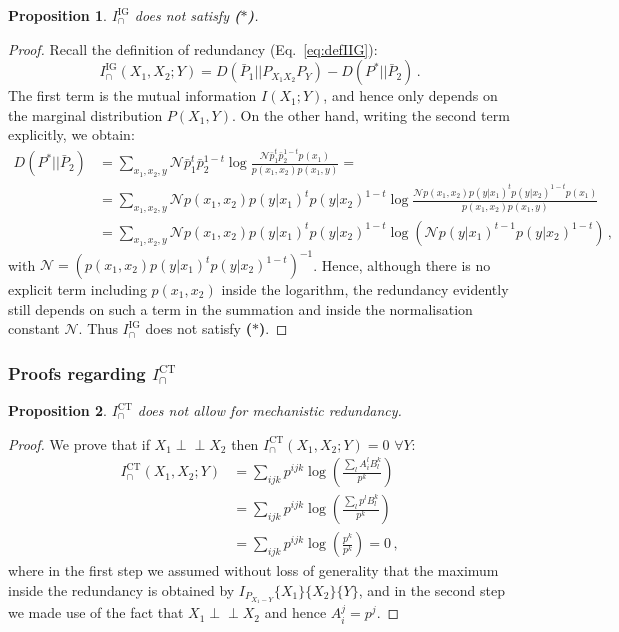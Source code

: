 \documentclass{article}
\newcommand{\ind}{\mathrel{\perp\!\!\!\perp}}
\newcommand{\argct}[3]{\{#1\}\{#2\}\{#3\}}
\newcommand{\AST}{\textbf{($\boldsymbol{\ast}$)}\xspace} %
\newcommand{\ICT}{\ensuremath{I_\cap^{\text{CT}}}\xspace}
\newcommand{\IIG}{\ensuremath{I_\cap^{\text{IG}}}\xspace}
\newcommand{\IIGs}{\ensuremath{I_\cap^{\text{IG}}(X_1,X_2;Y)}\xspace}
\newtheorem{proposition}{Proposition}
\begin{document}
\begin{proposition} \label{prop:IG-noAST}
    \IIG does not satisfy \AST.
\end{proposition}
\begin{proof}
    Recall the definition of redundancy (Eq.~\eqref{eq:defIIG}):
    \begin{equation}
        \IIGs = D(\bar{P}_1||P_{X_1X_2}P_Y)-D(P^*||\bar{P}_2) \,.
    \end{equation}
    The first term is the mutual information $I(X_1; Y)$, and hence only depends on the marginal distribution $P(X_1, Y)$. On the other hand, writing the second term explicitly, we obtain:
    \begin{equation}
        \begin{split}
            D(P^*||\bar{P}_2) & = \sum_{x_1,x_2,y} \mathcal{N}\bar{p}_1^t\bar{p}_2^{1-t} \log \frac{\mathcal{N}\bar{p}_1^t\bar{p}_2^{1-t}p(x_1)}{p(x_1,x_2)p(x_1,y)} = \\
            & = \sum_{x_1,x_2,y} \mathcal{N}p(x_1,x_2)p(y|x_1)^t p(y|x_2)^{1-t} \log \frac{\mathcal{N}p(x_1,x_2)p(y|x_1)^t p(y|x_2)^{1-t}p(x_1)}{p(x_1,x_2)p(x_1,y)} \\
            & = \sum_{x_1,x_2,y} \mathcal{N}p(x_1,x_2)p(y|x_1)^t p(y|x_2)^{1-t} \log \left(\mathcal{N}p(y|x_1)^{t-1} p(y|x_2)^{1-t}\right) \,,
        \end{split}
    \end{equation}
    with $\mathcal{N} = (p(x_1,x_2)p(y|x_1)^t p(y|x_2)^{1-t})^{-1}$.
    Hence, although there is no explicit term including $p(x_1,x_2)$ inside the logarithm, the redundancy evidently still depends on such a term in the summation and inside the normalisation constant $\mathcal{N}$. Thus \IIG does not satisfy \AST. 
\end{proof}

\subsubsection{Proofs regarding \ICT}



\begin{proposition} \label{prop:CT-noMechRed}
    $\ICT$ does not allow for mechanistic redundancy.
\end{proposition}
\begin{proof}
    We prove that if $X_1\ind X_2$ then $\ICT(X_1,X_2;Y)=0$ $\forall Y$: 
    \begin{equation}
    \begin{aligned}
        \ICT(X_1,X_2;Y) & = \sum_{ijk} p^{ijk} \log \left(\frac{\sum_l A_i^lB^k_l}{p^k} \right) \\
        & = \sum_{ijk}p^{ijk}\log\left(\frac{\sum_l p^lB^k_l}{p^k} \right) \\
        & = \sum_{ijk}p^{ijk}\log\left(\frac{p^k}{p^k} \right) = 0 \,,
    \end{aligned}
    \end{equation}
    where in the first step we assumed without loss of generality that the maximum inside the redundancy is obtained by $I_{P_{X_1-Y}}\argct{X_1}{X_2}{Y}$, and in the second step we made use of the fact that $X_1\ind X_2$ and hence $A^j_i=p^j$.
\end{proof}
\end{document}
